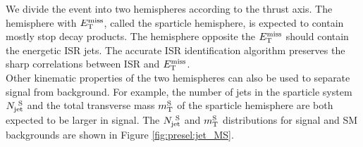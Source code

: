 \indent We divide the event into two hemispheres according to the thrust axis.  The hemisphere with $E_{\mathrm{T}}^{\mathrm{miss}}$, called the sparticle hemisphere, is expected to contain mostly stop decay products. The hemisphere opposite the $E_{\mathrm{T}}^{\mathrm{miss}}$ should contain the energetic ISR jets.  The accurate ISR identification algorithm preserves the sharp correlations between ISR and $E_{\mathrm{T}}^{\mathrm{miss}}$.  \\

\indent Other kinematic properties of the two hemispheres can also be used to separate signal from background.  For example, the number of jets in the sparticle system $N_{\mathrm{jet}}^{~\mathrm{S}}$ and the total transverse mass $m_{\mathrm{T}}^{\mathrm{S}}$ of the sparticle hemisphere are both expected to be larger in signal.  The $N_{\mathrm{jet}}^{~\mathrm{S}}$ and $m_{\mathrm{T}}^{\mathrm{S}}$ distributions for signal and SM backgrounds are shown in Figure \ref{fig:presel:jet_MS}. \\

